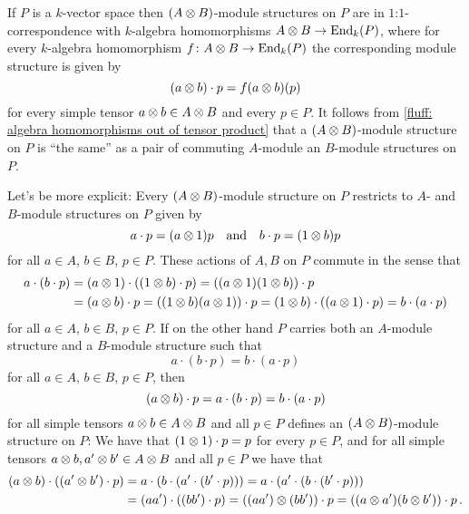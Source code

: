 \begin{fluff}
  \label{fluff: commuting modules structures for tensor products}
  If $P$ is a $k$-vector space then $(A \mathbin{\otimes} B)$-module structures on $P$ are in $1$:$1$-correspondence with $k$-algebra homomorphisms $A \mathbin{\otimes} B \to \operatorname{End}_k(P)$, where for every $k$-algebra homomorphism $f \colon A \mathbin{\otimes} B \to \operatorname{End}_k(P)$ the corresponding module structure is given by
  \[
      (a \mathbin{\otimes} b) \cdot p
    = f(a \mathbin{\otimes} b)(p)
  \]
  for every simple tensor $a \mathbin{\otimes} b \in A \mathbin{\otimes} B$ and every $p \in P$.
  It follows from \ref{fluff: algebra homomorphisms out of tensor product} that a $(A \mathbin{\otimes} B)$-module structure on $P$ is \enquote{the same} as a pair of commuting $A$-module an $B$-module structures on $P$.
  
  Let’s be more explicit:
  Every $(A \mathbin{\otimes} B)$-module structure on $P$ restricts to $A$- and $B$-module structures on $P$ given by
  \[
      a \cdot p
    = (a \mathbin{\otimes} 1) p
    \quad\text{and}\quad
      b \cdot p
    = (1 \mathbin{\otimes} b) p
  \]
  for all $a \in A$, $b \in B$, $p \in P$.
  These actions of $A, B$ on $P$ commute in the sense that
  \begin{align*}
        a \cdot (b \cdot p)
    &=  (a \mathbin{\otimes} 1) \cdot ( (1 \mathbin{\otimes} b) \cdot p )
     =  ((a \mathbin{\otimes} 1) (1 \mathbin{\otimes} b)) \cdot p \\
    &=  (a \mathbin{\otimes} b) \cdot p
     =  ((1 \mathbin{\otimes} b) (a \mathbin{\otimes} 1)) \cdot p
     =  (1 \mathbin{\otimes} b) \cdot ( (a \mathbin{\otimes} 1) \cdot p )
     =  b \cdot (a \cdot p)
  \end{align*}
  for all $a \in A$, $b \in B$, $p \in P$.
  If on the other hand $P$ carries both an $A$-module structure and a $B$-module structure such that
  \[
      a \cdot (b \cdot p)
    = b \cdot (a \cdot p)
  \]
  for all $a \in A$, $b \in B$, $p \in P$, then
  \[
      (a \mathbin{\otimes} b) \cdot p
    = a \cdot (b \cdot p)
    = b \cdot (a \cdot p)
  \]
  for all simple tensors $a \mathbin{\otimes} b \in A \mathbin{\otimes} B$ and all $p \in P$ defines an $(A \mathbin{\otimes} B)$-module structure on $P$:
  We have that $(1 \mathbin{\otimes} 1) \cdot p = p$ for every $p \in P$, and for all simple tensors $a \mathbin{\otimes} b, a' \mathbin{\otimes} b' \in A \mathbin{\otimes} B$ and all $p \in P$ we have that
  \begin{align*}
        (a \tensor b) \cdot ( (a' \tensor b') \cdot p )
    &=  a \cdot (b \cdot (a' \cdot (b' \cdot p)))
     =  a \cdot (a' \cdot (b \cdot (b' \cdot p))) \\
    &=  (aa') \cdot ( (bb') \cdot p )
     =  ((aa') \tensor (bb')) \cdot p
     =  ( (a \tensor a') (b \tensor b') ) \cdot p \,.

\end{align*}
\end{fluff}
